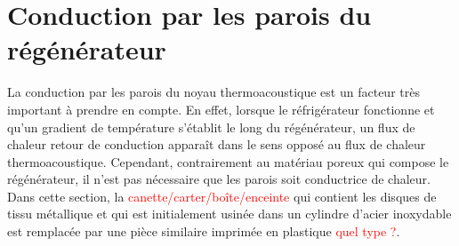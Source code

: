 \section{Conduction par les parois du régénérateur}
La conduction par les parois du noyau thermoacoustique est un facteur très important à prendre en compte. En effet, lorsque le réfrigérateur fonctionne et qu'un gradient de température s'établit le long du régénérateur, un flux de chaleur \og retour \fg{} de conduction apparaît dans le sens opposé au flux de chaleur thermoacoustique. Cependant, contrairement au matériau poreux qui compose le régénérateur, il n'est pas nécessaire que les parois soit conductrice de chaleur. Dans cette section, la \textcolor{red}{canette/carter/boîte/enceinte} qui contient les disques de tissu métallique et qui est initialement usinée dans un cylindre d'acier inoxydable est remplacée par une pièce similaire imprimée en plastique \textcolor{red}{quel type ?}.

